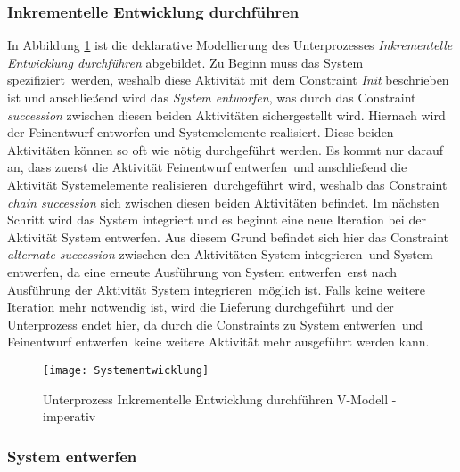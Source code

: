 {\subsubsection{Inkrementelle Entwicklung durchführen}
In Abbildung \ref{fig:Systementwicklung} ist die deklarative Modellierung des Unterprozesses \textit{Inkrementelle Entwicklung durchführen} abgebildet. \newline
Zu Beginn muss das \grqq System spezifiziert\grqq \ werden, weshalb diese Aktivität mit dem Constraint \textit{Init} beschrieben ist und anschließend wird das \textit{System entworfen}, was durch das Constraint \textit{succession} zwischen diesen beiden Aktivitäten sichergestellt wird.\newline
Hiernach wird der Feinentwurf entworfen und Systemelemente realisiert. Diese beiden Aktivitäten können so oft wie nötig durchgeführt werden. Es kommt nur darauf an, dass zuerst die Aktivität \grqq Feinentwurf entwerfen\grqq \ und anschließend die Aktivität \grqq Systemelemente realisieren\grqq \ durchgeführt wird, weshalb das Constraint \textit{chain succession} sich zwischen diesen beiden Aktivitäten befindet. \newline
Im nächsten Schritt wird das System integriert und es beginnt eine neue Iteration bei der Aktivität System entwerfen. Aus diesem Grund befindet sich hier das Constraint \textit{alternate succession} zwischen den Aktivitäten \grqq System integrieren\grqq \ und \grqq System entwerfen\grqq, da eine erneute Ausführung von \grqq System entwerfen\grqq \ erst nach Ausführung der Aktivität \grqq System integrieren\grqq \ möglich ist. \newline
Falls keine weitere Iteration mehr notwendig ist, wird die \grqq Lieferung durchgeführt\grqq \ und der Unterprozess endet hier, da durch die Constraints zu \grqq System entwerfen\grqq \ und \grqq Feinentwurf entwerfen\grqq \ keine weitere Aktivität mehr ausgeführt werden kann. \newline
\begin{figure}[!htbp]
\begin{center}
  \texttt{[image: Systementwicklung]} %
  \caption{Unterprozess Inkrementelle Entwicklung durchführen V-Modell - imperativ}
  \label{fig:Systementwicklung}
\end{center}
\end{figure}



\subsubsection{System entwerfen}


}
